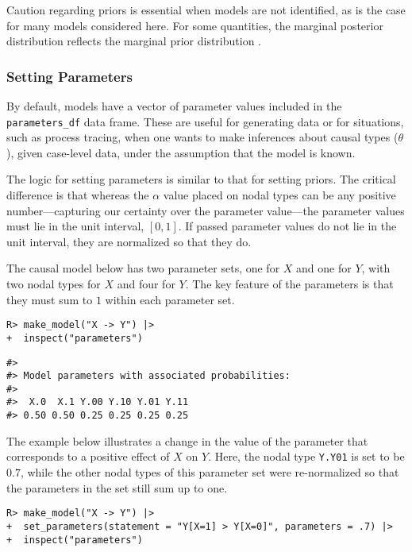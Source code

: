 \documentclass[
  11pt,
  article]{jss}
\begin{document}
Caution regarding priors is essential when models are not identified, as
is the case for many models considered here. For some quantities, the
marginal posterior distribution reflects the marginal prior distribution
\citep{poirier_revising_1998}.

\subsubsection{Setting Parameters}\label{parameters}

By default, models have a vector of parameter values included in the
\texttt{parameters\_df} data frame. These are useful for generating data
or for situations, such as process tracing, when one wants to make
inferences about causal types (\(\theta\)), given case-level data, under
the assumption that the model is known.

The logic for setting parameters is similar to that for setting priors.
The critical difference is that whereas the \(\alpha\) value placed on
nodal types can be any positive number---capturing our certainty over
the parameter value---the parameter values must lie in the unit
interval, \([0,1]\). If passed parameter values do not lie in the unit
interval, they are normalized so that they do.

The causal model below has two parameter sets, one for \(X\) and one for
\(Y\), with two nodal types for \(X\) and four for \(Y\). The key
feature of the parameters is that they must sum to \(1\) within each
parameter set.

\begin{verbatim}
R> make_model("X -> Y") |> 
+  inspect("parameters")
\end{verbatim}

\begin{verbatim}
#> 
#> Model parameters with associated probabilities: 
#> 
#>  X.0  X.1 Y.00 Y.10 Y.01 Y.11 
#> 0.50 0.50 0.25 0.25 0.25 0.25
\end{verbatim}

The example below illustrates a change in the value of the parameter
that corresponds to a positive effect of \(X\) on \(Y\). Here, the nodal
type \texttt{Y.Y01} is set to be \(0.7\), while the other nodal types of
this parameter set were re-normalized so that the parameters in the set
still sum up to one.

\begin{verbatim}
R> make_model("X -> Y") |>
+  set_parameters(statement = "Y[X=1] > Y[X=0]", parameters = .7) |>
+  inspect("parameters")
\end{verbatim}
\end{document}
